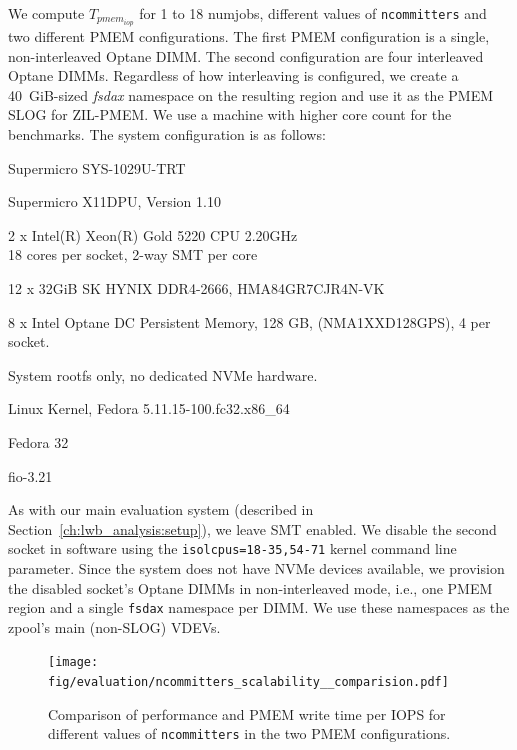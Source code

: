 \documentclass[12pt,a4paper,twoside]{book}
\begin{document}
We compute $T_{pmem_{iop}}$ for 1 to 18 numjobs, different values of \lstinline{ncommitters} and two different PMEM configurations.
The first PMEM configuration is a single, non-interleaved Optane DIMM.
The second configuration are four interleaved Optane DIMMs.
Regardless of how interleaving is configured, we create a 40~GiB-sized \textit{fsdax} namespace on the resulting region and use it as the PMEM SLOG for ZIL-PMEM.
We use a machine with higher core count for the benchmarks.
The system configuration is as follows:
\begin{description}[noitemsep,leftmargin=1.5cm,labelindent=1cm]
    \item[System] Supermicro SYS-1029U-TRT
    \item[Mainboard] Supermicro X11DPU, Version 1.10
    \item[CPU] 2 x Intel(R) Xeon(R) Gold 5220 CPU \@ 2.20GHz \\
        18 cores per socket, 2-way SMT per core
    \item[DRAM] 12 x 32GiB SK HYNIX DDR4-2666, HMA84GR7CJR4N-VK  %
    \item[PMEM] 8 x Intel Optane DC Persistent Memory, 128 GB, (NMA1XXD128GPS), 4 per socket.
    \item[NVMe] System rootfs only, no dedicated NVMe hardware.
    \item[Kernel] Linux Kernel, Fedora 5.11.15-100.fc32.x86\_64
    \item[Userland] Fedora 32
    \item[fio] fio-3.21
\end{description}
As with our main evaluation system (described in Section~\ref{ch:lwb_analysis:setup}), we leave SMT enabled.
We disable the second socket in software using the \lstinline{isolcpus=18-35,54-71} kernel command line parameter.
Since the system does not have NVMe devices available, we provision the disabled socket's Optane DIMMs in non-interleaved mode, i.e., one PMEM region and a single \lstinline{fsdax} namespace per DIMM.
We use these namespaces as the zpool's main (non-SLOG) VDEVs.

\begin{figure}
    \centering
    \texttt{[image: fig/evaluation/ncommitters\_scalability\_\_comparision.pdf]}
    \caption{Comparison of performance and PMEM write time per IOPS for different values of \lstinline{ncommitters} in the two PMEM configurations.}
    \label{fig:eval:ncommitters_scalability:main}
\end{figure}
\end{document}
